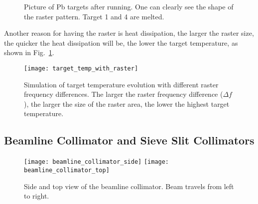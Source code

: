 \begin{figure}
    \caption{Picture of Pb targets after running. One can clearly see the shape
    of the raster pattern. Target 1 and 4 are melted.}
\end{figure}

Another reason for having the raster is heat dissipation, the larger the raster size,
the quicker the heat dissipation will be, the lower the target temperature, as
shown in Fig.~\ref{fig:target_temp_with_raster}.
\begin{figure}
    \centering
    \texttt{[image: target\_temp\_with\_raster]}
    \caption[Target temperature]
    {Simulation of target temperature evolution with different raster frequency
    differences. The larger the raster frequency difference ($\Delta f$), the larger
    the size of the raster area, the lower the highest target temperature.}
    \label{fig:target_temp_with_raster}
\end{figure}

\subsection{Beamline Collimator and Sieve Slit Collimators}
\begin{figure}[!h]
    \centering
    \texttt{[image: beamline\_collimator\_side]}
    \hspace{1 cm}
    \texttt{[image: beamline\_collimator\_top]}
    \caption[beamline collimator]
    {Side and top view of the beamline collimator. Beam travels from left to right.}
    \label{fig:beamline_collimator}
\end{figure}

